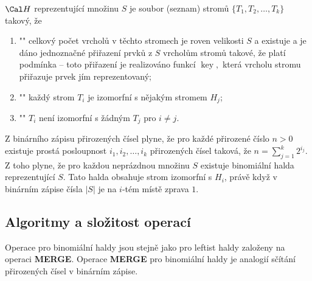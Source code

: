 \documentclass[a4paper,12pt]{article}
\def \emph#1{\underbar{#1}}
\DeclareMathOperator*{\key}{key}
\begin{document}
\emph{Binomiální} \emph{halda} $\Cal H$ reprezentující 
množinu $S$ je soubor (seznam) stromů $\{T_1,T_2,\dots
,T_k\}$ 
takový, že 
\begin{enumerate}
\item"{}"
celkový počet vrcholů v těchto stromech je 
roven velikosti $S$ a 
existuje a je dáno jednoznačné přiřazení prvků 
z $S$ vrcholům stromů takové, že platí 
podmínka  -- toto přiřazení je realizováno 
funkcí 
$\key,$ která vrcholu stromu přiřazuje prvek jím reprezentovaný;
\item"{}"
každý strom $T_i$ je izomorfní s nějakým stromem $H_
j$;
\item"{}"
$T_i$ není izomorfní s žádným $T_j$ pro $i\ne j$.
\end{enumerate}

Z binárního zápisu přirozených čísel plyne, že 
pro každé přiro\-ze\-né číslo $n>0$ existuje prostá 
posloupnost $i_1,i_2,\dots,i_k$ přiro\-ze\-ných čísel taková, že 
$n=\sum_{j=1}^k2^{i_j}$. Z toho plyne, že pro každou neprázd\-nou 
množinu $S$ existuje binomiální halda repre\-zentující $
S$.
Tato halda obsahuje strom izomorfní s $H_i$, právě když v 
binárním zápise čísla $|S|$ je na $i$-tém místě zprava $
1$.

\subsection{
Algoritmy a složitost operací
}

Operace pro binomiální haldy jsou  
stejně jako pro leftist haldy založeny na ope\-raci {\bf MER\-GE}. Ope\-race 
{\bf MERGE} pro binomiální haldy je analogií sčítání 
přirozených čísel v binár\-ním zápise.
\end{document}
